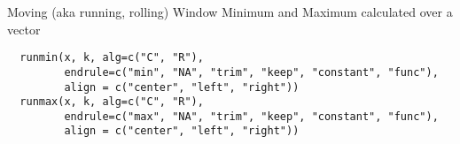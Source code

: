 \begin{Description}\relax
Moving (aka running, rolling) Window Minimum and Maximum 
calculated over a vector
\end{Description}
\begin{Usage}
\begin{verbatim}
  runmin(x, k, alg=c("C", "R"),
         endrule=c("min", "NA", "trim", "keep", "constant", "func"),
         align = c("center", "left", "right"))
  runmax(x, k, alg=c("C", "R"),
         endrule=c("max", "NA", "trim", "keep", "constant", "func"),
         align = c("center", "left", "right"))
\end{verbatim}
\end{Usage}
